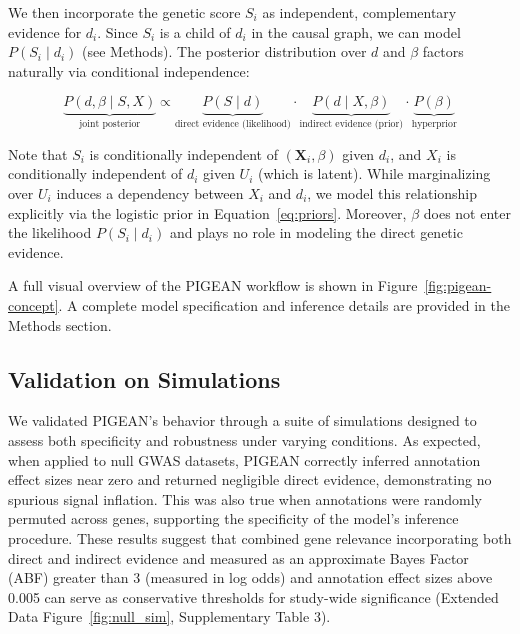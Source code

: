\documentclass[sn-nature,lineno]{sn-jnl}%
\theoremstyle{thmstyleone}%
\theoremstyle{thmstyletwo}%
\theoremstyle{thmstylethree}%
\begin{document}
We then incorporate the genetic score $S_i$ as independent, complementary evidence for $d_i$. Since $S_i$ is a child of $d_i$ in the causal graph, we can model $P(S_i \mid d_i)$ (see Methods). The posterior distribution over $d$ and $\beta$ factors naturally via conditional independence:

\begin{equation}
\underbrace{P(d, \beta \mid S, X)}_{\text{joint posterior}} \propto 
\underbrace{P(S \mid d)}_{\text{direct evidence (likelihood)}} \cdot 
\underbrace{P(d \mid X, \beta)}_{\text{indirect evidence (prior)}} \cdot 
\underbrace{P(\beta)}_{\text{hyperprior}}
\end{equation}

Note that $S_i$ is conditionally independent of $(\mathbf{X}_i, \beta)$ given $d_i$, and $X_i$ is conditionally independent of $d_i$ given $U_i$ (which is latent). While marginalizing over $U_i$ induces a dependency between $X_i$ and $d_i$, we model this relationship explicitly via the logistic prior in Equation~\ref{eq:priors}. Moreover, $\beta$ does not enter the likelihood $P(S_i \mid d_i)$ and plays no role in modeling the direct genetic evidence.

A full visual overview of the PIGEAN workflow is shown in Figure~\ref{fig:pigean-concept}. A complete model specification and inference details are provided in the Methods section.

\subsection{Validation on Simulations} \label{sec:validation-sim}
We validated PIGEAN’s behavior through a suite of simulations designed to assess both specificity and robustness under varying conditions. As expected, when applied to null GWAS datasets, PIGEAN correctly inferred annotation effect sizes near zero and returned negligible direct evidence, demonstrating no spurious signal inflation. This was also true when annotations were randomly permuted across genes, supporting the specificity of the model’s inference procedure. These results suggest that combined gene relevance incorporating both direct and indirect evidence and measured as an approximate Bayes Factor (ABF) greater than 3 (measured in log odds) and annotation effect sizes above 0.005 can serve as conservative thresholds for study-wide significance (Extended Data Figure~\ref{fig:null_sim}, Supplementary Table 3).
\end{document}
